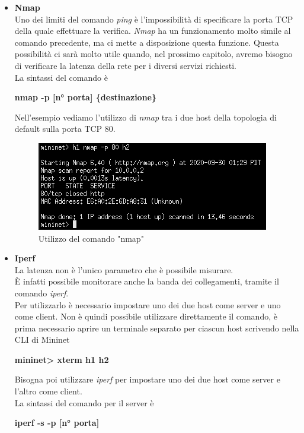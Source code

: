 \begin{itemize}
	\item \textbf{Nmap}\\
	Uno dei limiti del comando \textit{ping} è l'impossibilità di specificare la porta TCP della quale effettuare la verifica. \textit{Nmap} ha un funzionamento molto simile al comando precedente, ma ci mette a disposizione questa funzione. Questa possibilità ci sarà molto utile quando, nel prossimo capitolo, avremo bisogno di verificare la latenza della rete per i diversi servizi richiesti.\\
	La sintassi del comando è
	\begin{center}
		\textbf{nmap -p [n° porta] \{destinazione\}}
	\end{center}
	Nell'esempio vediamo l'utilizzo di \textit{nmap} tra i due host della topologia di default sulla porta TCP 80.
	\begin{figure}[h!]
		\centering
		\includegraphics[width=0.85\linewidth]{../immagini/mn/nmap}
		\caption[Comando "nmap"]{Utilizzo del comando "nmap"}
		\label{fig:nmap}
	\end{figure}
	\item \textbf{Iperf}\\
	La latenza non è l'unico parametro che è possibile misurare.\\È infatti possibile monitorare anche la banda dei collegamenti, tramite il comando \textit{iperf}.\\Per utilizzarlo è necessario impostare uno dei due host come server e uno come client. Non è quindi possibile utilizzare direttamente il comando, è prima necessario aprire un terminale separato per ciascun host scrivendo nella CLI di Mininet
	\begin{center}
		\textbf{mininet> xterm h1 h2}
	\end{center}
	Bisogna poi utilizzare \textit{iperf} per impostare uno dei due host come server e l'altro come client.\\
	La sintassi del comando per il server è
	\begin{center}
		\textbf{iperf -s -p [n° porta]}
	\end{center}

\end{itemize}
